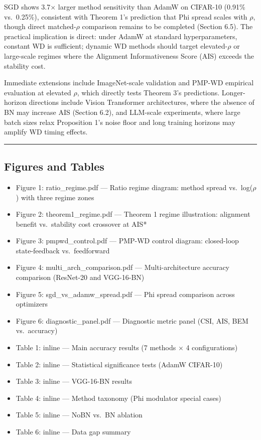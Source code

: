 \documentclass[
]{article}
\providecommand{\tightlist}{%
  \setlength{\itemsep}{0pt}\setlength{\parskip}{0pt}}
\begin{document}
SGD shows 3.7\(\times\) larger method sensitivity than AdamW on CIFAR-10
(0.91\% vs.~0.25\%), consistent with Theorem 1's prediction that Phi
spread scales with \(\rho\), though direct matched-\(\rho\) comparison
remains to be completed (Section 6.5). The practical implication is
direct: under AdamW at standard hyperparameters, constant WD is
sufficient; dynamic WD methods should target elevated-\(\rho\) or
large-scale regimes where the Alignment Informativeness Score (AIS)
exceeds the stability cost.

Immediate extensions include ImageNet-scale validation and PMP-WD
empirical evaluation at elevated \(\rho\), which directly tests Theorem
3's predictions. Longer-horizon directions include Vision Transformer
architectures, where the absence of BN may increase AIS (Section 6.2),
and LLM-scale experiments, where large batch sizes relax Proposition 1's
noise floor and long training horizons may amplify WD timing effects.

\begin{center}\rule{0.5\linewidth}{0.5pt}\end{center}

\hypertarget{figures-and-tables}{%
\subsection{Figures and Tables}\label{figures-and-tables}}

\begin{itemize}
\tightlist
\item
  Figure 1: ratio\_regime.pdf --- Ratio regime diagram: method spread
  vs.~log(\(\rho\)) with three regime zones
\item
  Figure 2: theorem1\_regime.pdf --- Theorem 1 regime illustration:
  alignment benefit vs.~stability cost crossover at AIS*
\item
  Figure 3: pmpwd\_control.pdf --- PMP-WD control diagram: closed-loop
  state-feedback vs.~feedforward
\item
  Figure 4: multi\_arch\_comparison.pdf --- Multi-architecture accuracy
  comparison (ResNet-20 and VGG-16-BN)
\item
  Figure 5: sgd\_vs\_adamw\_spread.pdf --- Phi spread comparison across
  optimizers
\item
  Figure 6: diagnostic\_panel.pdf --- Diagnostic metric panel (CSI, AIS,
  BEM vs.~accuracy)
\item
  Table 1: inline --- Main accuracy results (7 methods \(\times\) 4
  configurations)
\item
  Table 2: inline --- Statistical significance tests (AdamW CIFAR-10)
\item
  Table 3: inline --- VGG-16-BN results
\item
  Table 4: inline --- Method taxonomy (Phi modulator special cases)
\item
  Table 5: inline --- NoBN vs.~BN ablation
\item
  Table 6: inline --- Data gap summary
\end{itemize}
\end{document}
